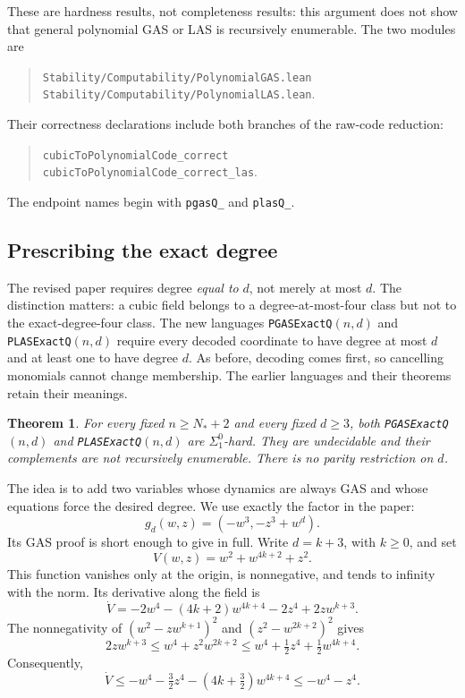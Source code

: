 \documentclass[11pt]{article}
\newtheorem{theorem}{Theorem}[section]
\newcommand{\code}[1]{{\small\nolinkurl{#1}}}
\begin{document}
These are hardness results, not completeness results: this argument does
not show that general polynomial GAS or LAS is recursively enumerable.
The two modules are
\begin{quote}
\code{Stability/Computability/PolynomialGAS.lean}\\
\code{Stability/Computability/PolynomialLAS.lean}.
\end{quote}
Their correctness declarations include both branches of the raw-code
reduction:
\begin{quote}
\code{cubicToPolynomialCode_correct}\\
\code{cubicToPolynomialCode_correct_las}.
\end{quote}
The endpoint names begin with \code{pgasQ_} and \code{plasQ_}.

\subsection{Prescribing the exact degree}\label{sec:exactdegree}

The revised paper requires degree \emph{equal to} $d$, not merely at most
$d$. The distinction matters: a cubic field belongs to a degree-at-most-four
class but not to the exact-degree-four class. The new languages
\code{PGASExactQ}$(n,d)$ and \code{PLASExactQ}$(n,d)$ require every decoded
coordinate to have degree at most $d$ and at least one to have degree $d$.
As before, decoding comes first, so cancelling monomials cannot change
membership. The earlier languages and their theorems retain their meanings.

\begin{theorem}
For every fixed $n\ge N_*+2$ and every fixed $d\ge3$, both
\code{PGASExactQ}$(n,d)$ and \code{PLASExactQ}$(n,d)$ are $\Sigma^0_1$-hard.
They are undecidable and their complements are not recursively enumerable.
There is no parity restriction on $d$.
\end{theorem}

The idea is to add two variables whose dynamics are always GAS and whose
equations force the desired degree. We use exactly the factor in the paper:
\[
 g_d(w,z)=(-w^3,-z^3+w^d).
\]
Its GAS proof is short enough to give in full. Write $d=k+3$, with $k\ge0$,
and set
\[
 V(w,z)=w^2+w^{4k+2}+z^2.
\]
This function vanishes only at the origin, is nonnegative, and tends to
infinity with the norm. Its derivative along the field is
\[
 \dot V=-2w^4-(4k+2)w^{4k+4}-2z^4+2zw^{k+3}.
\]
The nonnegativity of $(w^2-zw^{k+1})^2$ and
$(z^2-w^{2k+2})^2$ gives
\[
 2zw^{k+3}\le w^4+z^2w^{2k+2}
 \le w^4+\tfrac12z^4+\tfrac12w^{4k+4}.
\]
Consequently,
\[
 \dot V\le-w^4-\tfrac32z^4-(4k+\tfrac32)w^{4k+4}
 \le-w^4-z^4.
\]
\end{document}
